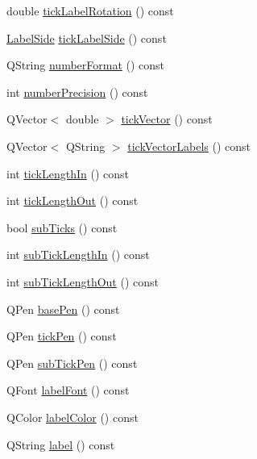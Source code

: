 \begin{DoxyCompactItemize}
\item 
double \mbox{\hyperlink{class_q_c_p_axis_a5c81e5d550266fdb9e11d96d1dc5713e}{tick\+Label\+Rotation}} () const
\item 
\mbox{\hyperlink{class_q_c_p_axis_a24b13374b9b8f75f47eed2ea78c37db9}{Label\+Side}} \mbox{\hyperlink{class_q_c_p_axis_a1dc21783965a7c7d9c29c2a75d0a54e1}{tick\+Label\+Side}} () const
\item 
Q\+String \mbox{\hyperlink{class_q_c_p_axis_a20cc29c2f282a0e9efd8f32145e47be6}{number\+Format}} () const
\item 
int \mbox{\hyperlink{class_q_c_p_axis_a2562b6f3a4a01c7ed83a388042664998}{number\+Precision}} () const
\item 
Q\+Vector$<$ double $>$ \mbox{\hyperlink{class_q_c_p_axis_a5aad9d6b34821ab0751dfc38dbc92a46}{tick\+Vector}} () const
\item 
Q\+Vector$<$ Q\+String $>$ \mbox{\hyperlink{class_q_c_p_axis_a1bd4a9036e0c9fc68b6f3df81f07e55f}{tick\+Vector\+Labels}} () const
\item 
int \mbox{\hyperlink{class_q_c_p_axis_ace2accb350fd3f3f474280f58c1d61c5}{tick\+Length\+In}} () const
\item 
int \mbox{\hyperlink{class_q_c_p_axis_ad3ba6614ccddf351f133e0acdd4f021e}{tick\+Length\+Out}} () const
\item 
bool \mbox{\hyperlink{class_q_c_p_axis_ad74153c38fd83b54c509cff249370beb}{sub\+Ticks}} () const
\item 
int \mbox{\hyperlink{class_q_c_p_axis_af907c8ecc4624d1bf4a8f6f702e64fbe}{sub\+Tick\+Length\+In}} () const
\item 
int \mbox{\hyperlink{class_q_c_p_axis_ac98c66cae50c98f3ae90e2969382976d}{sub\+Tick\+Length\+Out}} () const
\item 
Q\+Pen \mbox{\hyperlink{class_q_c_p_axis_a216974be018e73008b3cf6d033c1325d}{base\+Pen}} () const
\item 
Q\+Pen \mbox{\hyperlink{class_q_c_p_axis_affd022d4f56dfc575b4ced95ad417860}{tick\+Pen}} () const
\item 
Q\+Pen \mbox{\hyperlink{class_q_c_p_axis_a7a89df74ba427fac311bf4cc92fbddca}{sub\+Tick\+Pen}} () const
\item 
Q\+Font \mbox{\hyperlink{class_q_c_p_axis_aa7b465fe233f1878793954ba5ab9c47e}{label\+Font}} () const
\item 
Q\+Color \mbox{\hyperlink{class_q_c_p_axis_a05794f13d322da7fd9d5554d11186b0e}{label\+Color}} () const
\item 
Q\+String \mbox{\hyperlink{class_q_c_p_axis_a32ba4d3effcddd8af3bc49f405e1d53e}{label}} () const

\end{DoxyCompactItemize}
